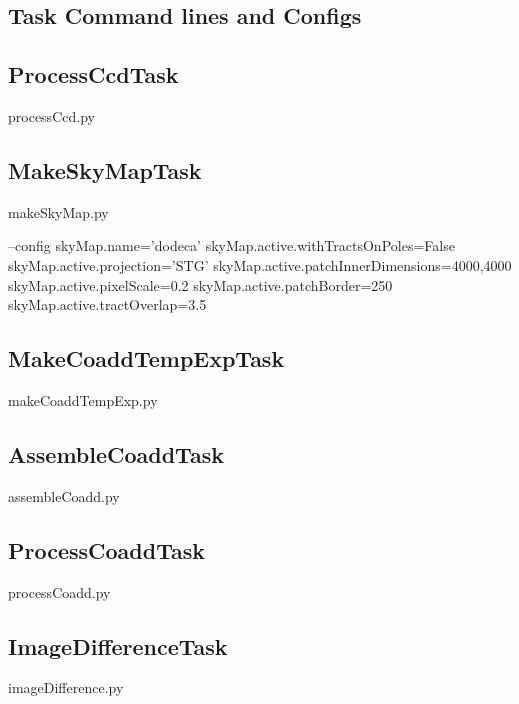 \documentclass[12pt]{article}
\begin{document}
\clearpage 
\begin{appendices}
\section{Task Command lines and Configs}

\subsection{ProcessCcdTask}
\begin{python}
processCcd.py
\end{python}


\subsection{MakeSkyMapTask}
\begin{python}
makeSkyMap.py

--config
skyMap.name='dodeca'
skyMap.active.withTractsOnPoles=False
skyMap.active.projection='STG'
skyMap.active.patchInnerDimensions=4000,4000
skyMap.active.pixelScale=0.2
skyMap.active.patchBorder=250
skyMap.active.tractOverlap=3.5
\end{python}

\subsection{MakeCoaddTempExpTask} 
\begin{python}
makeCoaddTempExp.py
\end{python}

\subsection{AssembleCoaddTask} 
\begin{python}
assembleCoadd.py
\end{python}

\subsection{ProcessCoaddTask} 
\begin{python}
processCoadd.py
\end{python}

\subsection{ImageDifferenceTask} 
\begin{python}
imageDifference.py
\end{python}


\end{appendices}
\end{document}
